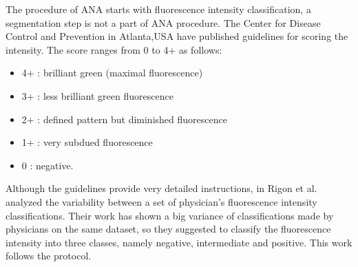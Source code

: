 The procedure of ANA starts with  fluorescence intensity classification, a segmentation step is not a part of ANA procedure. The Center for Disease Control and Prevention in Atlanta,USA have published  guidelines \cite{nakamura1996quality} for scoring the intensity. The score ranges from 0 to 4+ as follows:
\begin{itemize}
	\item 4+ : brilliant green (maximal fluorescence)
	\item 3+ : less brilliant green fluorescence
	\item 2+ : defined pattern but diminished fluorescence
	\item 1+ : very subdued fluorescence
	\item 0 : negative.
\end{itemize}

Although the guidelines provide  very detailed instructions, in \cite{Rigon2007} Rigon et al. analyzed the variability between a set of physician's fluorescence intensity  classifications. Their work has shown a big variance of classifications made by physicians on the same dataset, so they suggested to classify the fluorescence intensity into three classes, namely negative, intermediate and positive. This work follows the protocol. \\

